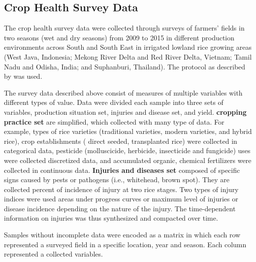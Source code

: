 \subsection*{Crop Health Survey Data}

The crop health survey data were collected through surveys of farmers' fields in two seasons (wet and dry seasons) from 2009 to 2015 in different production environments across South and South East in irrigated lowland rice growing areas (West Java, Indonesia; Mekong River Delta and Red River Delta, Vietnam; Tamil Nadu and Odisha, India; and Suphanburi, Thailand). The protocol as described by  was used.


The survey data described above consist of measures of multiple variables with different types of value. Data were divided each sample into three sets of variables, production situation set, injuries and disease set, and yield. \textbf{cropping practice set} are simplified, which collected with many type of data. For example, types of rice varieties (traditional varieties, modern varieties, and hybrid rice), crop establishments ( direct seeded, transplanted rice) were collected in categorical data, pesticide (molluscicide, herbicide, insecticide and fungicide) uses were collected discretized data, and accumulated organic, chemical fertilizers were collected in continuous data. \textbf{Injuries and diseases set} composed of specific signs caused by pests or pathogens (i.e., whitehead, brown spot). They are collected percent of incidence of injury at two rice stages. Two types of injury indices were used areas under progress curves or maximum level of injuries or disease incidence depending on the nature of the injury. The time-dependent information on injuries was thus synthesized and compacted over time.

Samples without incomplete data were encoded as a matrix in which each row represented a surveyed field in a specific location, year and season. Each column represented a collected variables.

